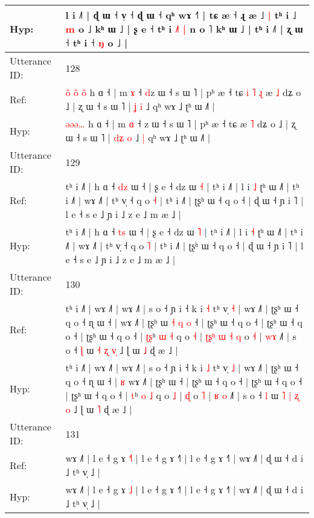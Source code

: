 \documentclass[10pt]{article}
\DeclareRobustCommand{\hl}[1]{{\textcolor{red}{#1}}}
\begin{document}
\begin{longtable}{ll}
Hyp: & l i ˩˥ | ɖ ɯ ˧ v̩ ˧ ɖ ɯ ˧ qʰ wɤ ˧˥ | tɕ æ ˧ ɻ æ ˩\hl{ }\hl{|} tʰ i ˩ \hl{m} o ˩ kʰ ɯ ˩ | ʂ e ˧ tʰ i\hl{ }\hl{˩}\hl{˥} \hl{|} n o ˥ kʰ ɯ ˩ | tʰ i ˩˥ | ʐ ɯ ˧ tʰ i ˧ \hl{ŋ} o ˩ |
 \\
\midrule
Utterance ID: & 128 \\
Ref: & \hl{o}\hl{̃}\hl{ }\hl{o}\hl{̃}\hl{ }\hl{o}\hl{̃} h ɑ ˧ | m \hl{ɤ} ˧ \hl{d}z ɯ ˧ s ɯ ˥ | pʰ æ ˧ tɕ\hl{ }\hl{i}\hl{ }\hl{˥}\hl{ }\hl{ɻ} æ \hl{˩} dʑ o ˩ | ʐ ɯ ˧ s ɯ ˥ | \hl{}\hl{ʝ} \hl{i} ˩\hl{}\hl{} qʰ wɤ ˩ ʈʰ ɯ ˩˥ |
 \\
Hyp: & \hl{}\hl{}\hl{}\hl{}\hl{ə}\hl{ə}\hl{ə}\hl{…} h ɑ ˧ | m \hl{ɑ} ˧ \hl{}z ɯ ˧ s ɯ ˥ | pʰ æ ˧ tɕ\hl{}\hl{}\hl{}\hl{}\hl{}\hl{} æ \hl{˥} dʑ o ˩ | ʐ ɯ ˧ s ɯ ˥ | \hl{d}\hl{ʑ} \hl{o} ˩\hl{ }\hl{|} qʰ wɤ ˩ ʈʰ ɯ ˩˥ |
 \\
\midrule
Utterance ID: & 129 \\
Ref: & tʰ i ˩˥ | h ɑ ˧ \hl{d}\hl{z} ɯ ˧ | ʂ e ˧ dz ɯ \hl{˧} | tʰ i ˩˥ | l i \hl{˩} ʈʰ ɯ ˩˥ | tʰ i ˩˥ | wɤ ˩˥ | tʰ v̩ ˧ q o \hl{˧} | tʰ i ˩˥ | ʈʂʰ ɯ ˧ q o ˧ | ɖ ɯ ˧ ɲ i ˥ | l e ˧ s e ˩ ɲ i ˩ z e ˩ m æ ˩ |
 \\
Hyp: & tʰ i ˩˥ | h ɑ ˧ \hl{t}\hl{s} ɯ ˧ | ʂ e ˧ dz ɯ \hl{˥} | tʰ i ˩˥ | l i \hl{˧} ʈʰ ɯ ˩˥ | tʰ i ˩˥ | wɤ ˩˥ | tʰ v̩ ˧ q o \hl{˥} | tʰ i ˩˥ | ʈʂʰ ɯ ˧ q o ˧ | ɖ ɯ ˧ ɲ i ˥ | l e ˧ s e ˩ ɲ i ˩ z e ˩ m æ ˩ |
 \\
\midrule
Utterance ID: & 130 \\
Ref: & tʰ i ˩˥ | wɤ ˩˥ | wɤ ˩˥ | s o ˧ ɲ i ˧ k i \hl{˧} tʰ v̩ \hl{˧} | wɤ ˩˥ | ʈʂʰ ɯ ˧ q o ˧ ɳ ɯ ˧ |\hl{}\hl{} wɤ ˩˥ | ʈʂʰ ɯ\hl{ }\hl{˧}\hl{ }\hl{q}\hl{ }\hl{o} ˧ | ʈʂʰ ɯ ˧ q o ˧ | ʈʂʰ ɯ ˧ q o ˧ | ʈʂʰ ɯ ˧ q o ˧ | \hl{ʈ}\hl{ʂ}ʰ \hl{ɯ} \hl{˧} q o \hl{˧} |\hl{ }\hl{ʈ}\hl{ʂ}\hl{ʰ}\hl{ }\hl{ɯ}\hl{ }\hl{˧} \hl{q} o \hl{˧} | \hl{}\hl{w}\hl{ɤ} ˩˥ | s o ˧ \hl{ɭ} ɯ \hl{˧} \hl{ʐ} \hl{}\hl{v}\hl{̩} ˩ ɭ ɯ \hl{˩} ɖ æ ˩ |
 \\
Hyp: & tʰ i ˩˥ | wɤ ˩˥ | wɤ ˩˥ | s o ˧ ɲ i ˧ k i \hl{˩} tʰ v̩ \hl{˩} | wɤ ˩˥ | ʈʂʰ ɯ ˧ q o ˧ ɳ ɯ ˧ |\hl{ }\hl{ʁ} wɤ ˩˥ | ʈʂʰ ɯ\hl{}\hl{}\hl{}\hl{}\hl{}\hl{} ˧ | ʈʂʰ ɯ ˧ q o ˧ | ʈʂʰ ɯ ˧ q o ˧ | ʈʂʰ ɯ ˧ q o ˧ | \hl{}\hl{t}ʰ \hl{o} \hl{˩} q o \hl{˩} |\hl{}\hl{}\hl{}\hl{}\hl{}\hl{}\hl{}\hl{} \hl{ɖ} o \hl{˥} | \hl{ʁ}\hl{ }\hl{o} ˩˥ | s o ˧ \hl{l} ɯ \hl{˥} \hl{|} \hl{ʐ}\hl{ }\hl{o} ˩ ɭ ɯ \hl{˥} ɖ æ ˩ |
 \\
\midrule
Utterance ID: & 131 \\
Ref: & wɤ ˩˥ | l e ˧ g ɤ \hl{˧}\hl{˥} | l e ˧ g ɤ ˧˥ | l e ˧ g ɤ ˧˥ | wɤ ˩˥ | ɖ ɯ ˧ d i ˩ tʰ v̩ ˩ |
 \\
Hyp: & wɤ ˩˥ | l e ˧ g ɤ \hl{}\hl{˩} | l e ˧ g ɤ ˧˥ | l e ˧ g ɤ ˧˥ | wɤ ˩˥ | ɖ ɯ ˧ d i ˩ tʰ v̩ ˩ |

\end{longtable}
\end{document}
